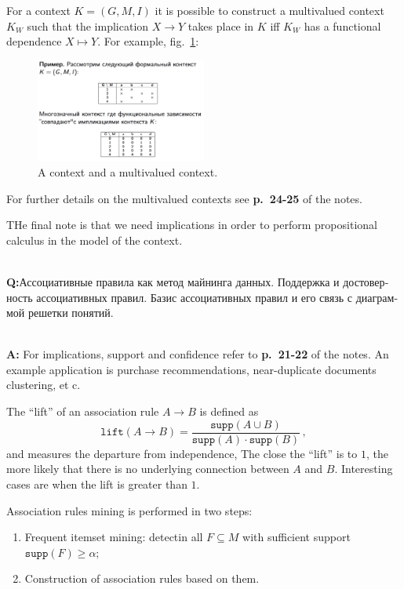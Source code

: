 \documentclass[a4paper]{article}
\newcommand{\rus}[1]{\foreignlanguage{russian}{#1}}
\begin{document}
For a context $K=(G, M, I)$ it is possible to construct a multivalued context
$K_W$ such that the implication $X\to Y$ takes place in $K$ iff $K_W$ has a functional
dependence $X\mapsto Y$. For example, fig.~\ref{fig:multivalued}:
\begin{figure}
    \centering
    \includegraphics[width=0.5\textwidth]{multivalued.png}
    \caption{A context and a multivalued context.}
    \label{fig:multivalued}
\end{figure}
For further details on the multivalued contexts see \textbf{p.~24-25} of the notes.

THe final note is that we need implications in order to perform propositional calculus
in the model of the context.

\hfill\\\textbf{Q:}\rus{Ассоциативные правила как метод майнинга данных. Поддержка
и достоверность ассоциативных правил. Базис ассоциативных правил и его связь с диаграммой
решетки понятий.}

\hfill\\\textbf{A:}
For implications, support and confidence refer to \textbf{p.~21-22} of the notes.
An example application is purchase recommendations, near-duplicate documents clustering,
et c.

The ``lift'' of an association rule $A\to B$ is defined as 
$$ \mathtt{lift}(A\to B)
    = \frac{\mathtt{supp}(A\cup B)}{\mathtt{supp}(A)\cdot \mathtt{supp}(B)}
    \,, $$
and measures the departure from independence, The close the ``lift'' is to $1$,
the more likely that there is no underlying connection between $A$ and $B$. Interesting
cases are when the lift is greater than $1$. 

Association rules mining is performed in two steps: \begin{enumerate}
    \item Frequent itemset mining: detectin all $F \subseteq M$ with sufficient
    support $\mathtt{supp}(F)\geq \alpha$;
    \item Construction of association rules based on them.
\end{enumerate}
\end{document}

